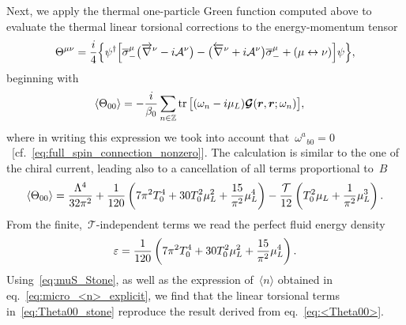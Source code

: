 \documentclass[11pt,a4paper]{article}
\begin{document}
Next, we apply the thermal one-particle Green function computed above to
evaluate the thermal linear torsional corrections to the
energy-momentum tensor
\begin{align}
\Theta^{\mu\nu}
={i\over 4}\Big\{
\psi^{\dagger}\Big[\overline{\sigma}_{-}^{\mu}
\big(\overrightarrow{\nabla}^{\nu}-i\mathcal{A}^{\nu}\big)
-\big(\overleftarrow{\nabla}^{\nu}+i\mathcal{A}^{\nu}\big)
\overline{\sigma}_{-}^{\mu}+(\mu\leftrightarrow\nu)\Big]\psi
\Big\},
\label{eq:emtensor_full_symmetric}
\end{align}
beginning with
\begin{align}
\langle \Theta_{00}\rangle
&=-{i\over \beta_{0}}
\sum_{n\in\mathbb{Z}}{\rm tr\,}\big[(\omega_{n}-i\mu_{L})
\boldsymbol{\mathcal{G}}(\boldsymbol{r},\boldsymbol{r};
\omega_{n})\big],
\end{align}
where in writing this expression we took into account 
that~$\omega^{a}_{\,\,\,\,b0}=0$~[cf.~\eqref{eq:full_spin_connection_nonzero}].
The calculation is similar to the one of the chiral current,
leading also to a cancellation of all terms proportional to~$B$
\begin{align}
\langle \Theta_{00}\rangle
={\Lambda^{4}\over 32\pi^{2}}+{1\over 120}\left(7\pi^{2}T_{0}^{4}
+30T_{0}^{2}\mu_{L}^{2}+{15\over \pi^{2}}\mu_{L}^{4}\right)
-{\mathcal{T}\over 12}\left(T_{0}^{2}\mu_{L}+{1\over \pi^{2}}\mu_{L}^{3}\right).
\label{eq:Theta00_stone}
\end{align} 
From the finite,~$\mathcal{T}$-independent terms we read the perfect fluid energy 
density~\cite{Jaiswal:2015mxa}
\begin{align}
\varepsilon={1\over 120}\left(7\pi^{2}T_{0}^{4}
+30T_{0}^{2}\mu_{L}^{2}+{15\over \pi^{2}}\mu_{L}^{4}\right).
\label{eq:energy_density_sb}
\end{align}
Using~\eqref{eq:muS_Stone}, as well as the expression of~$\langle n\rangle$ obtained in 
eq.~\eqref{eq:micro_<n>_explicit}, we find that the
linear torsional terms in~\eqref{eq:Theta00_stone} reproduce the result 
derived from eq.~\eqref{eq:<Theta00>}.
\end{document}
